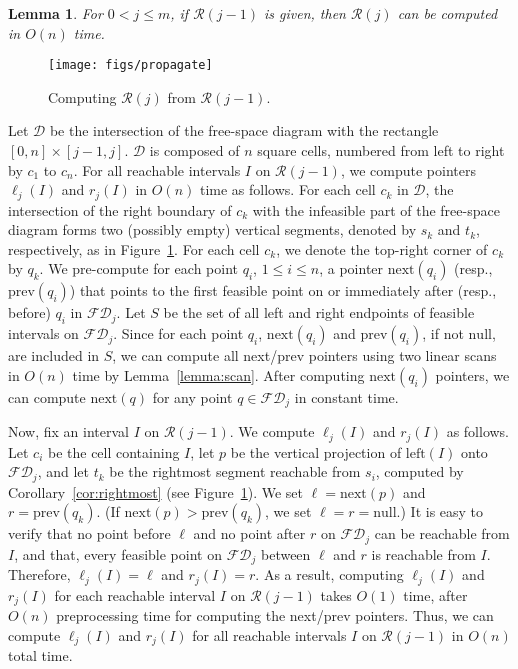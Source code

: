 \documentclass[12pt]{dalthesis}
\def\favoritefont{\bfseries \sffamily}
\def\QED{\ensuremath{{\Box}}}
\def\markatright#1{\leavevmode\unskip\nobreak\quad\hspace*{\fill}{#1}}
\newenvironment{proof}
	{\begin{trivlist}\item[\hskip\labelsep{\favoritefont Proof:}]}
	{\markatright{\QED}\end{trivlist}}
\newtheorem{lemma}[theorem]{Lemma}
\newcommand{\lee}{\leqslant}
\newcommand{\CR}{{\mathscr R}}
\newcommand{\Left}{\mbox{left}}
\newcommand{\fs}{free-space }
\newcommand{\FD}{\mathscr {FD}}
\newcommand{\nil}{\mbox{null}}
\newcommand{\CD}{{\mathscr D}}
\newcommand{\Next}{\mbox{next}}
\newcommand{\Prev}{\mbox{prev}}
\newcommand{\R}{\CR}
\newcommand{\lp}{\ell}
\newcommand{\rp}{r}
\begin{document}
\begin{lemma} \label{lemma:propagate}
	For $0 < j \lee m$, if $\R(j-1)$ is given,
	then $\R(j)$ can be computed in $O(n)$ time. 
\end{lemma}

	\begin{figure}[t]
		\centering
		\texttt{[image: figs/propagate]}
		\caption{Computing $\R(j)$ from $\R(j-1)$.}
		\label{fig:propagate}
	\end{figure}
	
\begin{proof}
	Let $\CD$ be the intersection of the \fs diagram
	with the rectangle $[0,n]\times[j-1,j]$.
	$\CD$ is composed of $n$ square cells, numbered from left to right by $c_1$ to $c_n$.
	For all reachable intervals $I$ on $\R(j-1)$, 
	we compute pointers $\lp_j(I)$ and $\rp_j(I)$
	in $O(n)$ time as follows.
	For each cell $c_k$ in $\CD$, the intersection of 
	the right boundary of $c_k$ with the infeasible part of the \fs diagram
	forms two (possibly empty) vertical segments, denoted by
	$s_k$ and $t_k$, respectively, as in Figure~\ref{fig:propagate}. 
	For each cell $c_k$, 
	we denote the top-right corner of $c_k$ by $q_k$.
	We pre-compute for each point $q_i$, $1 \lee i \lee n$,
	a pointer $\Next(q_i)$ (resp., $\Prev(q_i)$) 
	that points to the first feasible point on or immediately
	after (resp., before) $q_i$ in $\FD_j$.
	Let $S$ be the set of all left and right endpoints of feasible intervals on $\FD_j$.
	Since for each point $q_i$, $\Next(q_i)$ and $\Prev(q_i)$, if not $\nil$, are
	included in $S$, we can compute all next/prev pointers using two linear scans
	in $O(n)$ time by Lemma~\ref{lemma:scan}.
	After computing $\Next(q_i)$ pointers,
	we can compute $\Next(q)$ for any point $q \in \FD_j$ in constant time.
	
	Now, fix an interval $I$ on $\R(j-1)$.
	We compute $\lp_j(I)$ and $\rp_j(I)$ as follows.
	Let $c_i$ be the cell containing $I$,
	let $p$ be the vertical projection of $\Left(I)$ onto $\FD_j$,
	and let $t_k$ be the rightmost segment reachable from $s_i$,
	computed by Corollary~\ref{cor:rightmost}
	(see Figure~\ref{fig:propagate}).
	We set $\ell = \Next(p)$ and $r = \Prev(q_k)$.
	(If $\Next(p) > \Prev(q_k)$, we set $\ell = r = \nil$.)
	It is easy to verify that no point before $\ell$ and no point after $r$ on $\FD_j$
	can be reachable from $I$, and that, every feasible point on $\FD_j$ between 
	$\ell$ and $r$ is reachable from $I$. 
	Therefore, $\lp_j(I) = \ell$ and $\rp_j(I) = r$.
	As a result, computing $\lp_j(I)$ and $\rp_j(I)$ 
	for each reachable interval $I$ on $\R(j-1)$
	takes $O(1)$ time,
	after $O(n)$ preprocessing time for computing the next/prev pointers.
	Thus, we can compute $\lp_j(I)$ and $\rp_j(I)$ for all reachable intervals $I$ on $\R(j-1)$
	in $O(n)$ total time.


\end{proof}
\end{document}
